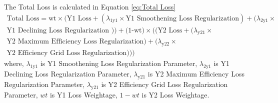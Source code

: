 \documentclass{report} %
\begin{document}
The Total Loss is calculated in Equation \ref{eq:Total Loss}
\begin{equation}
    \begin{split}
\text{Total Loss} = \text{wt} \times (\text{Y1 Loss} + (\lambda_{\text{1y1}} \times \text{Y1 Smoothening Loss Regularization}) +  (\lambda_{\text{2y1}} \times \\
\text{Y1 Declining Loss Regularization })) + \text{(1-wt)} \times ((\text{Y2 Loss} + (\lambda_{\text{y21}} \times \\ 
\text{Y2 Maximum Efficiency Loss Regularization}) + (\lambda_{\text{y22}} \times \\
\text{Y2 Efficiency Grid Loss Regularization})))
    \end{split}
    \label{eq:Total Loss}
\end{equation}
where, \(\lambda_{\text{1y1}}\) is Y1 Smoothening Loss Regularization Parameter, \(\lambda_{\text{2y1}}\) is Y1 Declining Loss Regularization Parameter,
        \(\lambda_{\text{y21}}\) is Y2 Maximum Efficiency Loss Regularization Parameter, \(\lambda_{\text{y21}}\) is Y2 Efficiency Grid Loss Regularization Parameter, 
        \(wt\) is Y1 Loss Weightage, \(1-wt\) is Y2 Loss Weightage. \\
\end{document}

